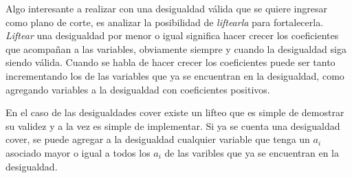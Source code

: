 Algo interesante a realizar con una desigualdad v\'alida que se quiere ingresar como plano de corte, es analizar la posibilidad de \emph{liftearla} para fortalecerla. \emph{Liftear} una desigualdad por menor o igual significa hacer crecer los coeficientes que acompa\~nan a las variables, obviamente siempre y cuando la desigualdad siga siendo v\'alida. Cuando se habla de hacer crecer los coeficientes puede ser tanto incrementando los de las variables que ya se encuentran en la desigualdad, como agregando variables a la desigualdad con coeficientes positivos.


En el caso de las desigualdades cover existe un lifteo que es simple de demostrar su validez y a la vez es simple de implementar. Si ya se cuenta una desigualdad cover, se puede agregar a la desigualdad cualquier variable que tenga un $a_i$ asociado mayor o igual a todos los $a_i$ de las varibles que ya se encuentran en la desigualdad.

